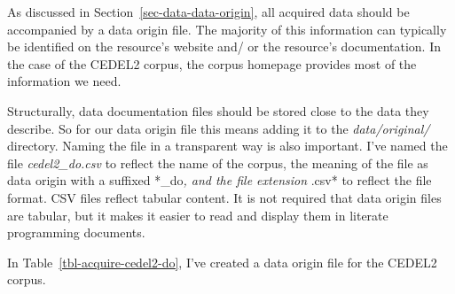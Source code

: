 \documentclass[
  letterpaper,
]{latex/krantz}
\theoremstyle{definition}
\theoremstyle{remark}
\begin{document}
As discussed in Section~\ref{sec-data-data-origin}, all acquired data
should be accompanied by a data origin file. The majority of this
information can typically be identified on the resource's website and/
or the resource's documentation. In the case of the CEDEL2 corpus, the
corpus homepage provides most of the information we need.

Structurally, data documentation files should be stored close to the
data they describe. So for our data origin file this means adding it to
the \emph{data/original/} directory. Naming the file in a transparent
way is also important. I've named the file \emph{cedel2\_do.csv} to
reflect the name of the corpus, the meaning of the file as data origin
with a suffixed *\_do\emph{, and the file extension }.csv* to reflect
the file format. CSV files reflect tabular content. It is not required
that data origin files are tabular, but it makes it easier to read and
display them in literate programming documents.

In Table~\ref{tbl-acquire-cedel2-do}, I've created a data origin file
for the CEDEL2 corpus.
\end{document}
